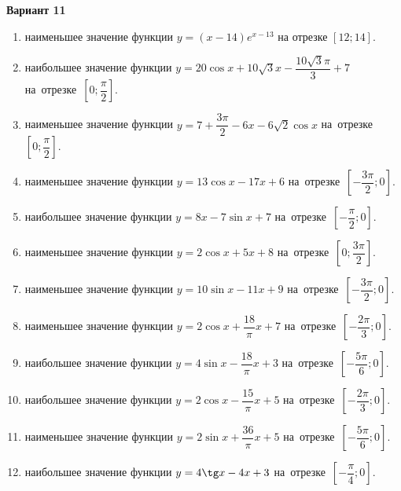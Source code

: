 \documentclass[a4paper,10pt]{article}
\begin{document}
\begin{center}\Large\textbf{Вариант 11}\end{center}

\begin{enumerate}
\item {} наименьшее значение функции $y=\left(x-14\right)e^{x-13}$ на отрезке $\left[12;14\right]$.

\item {} наибольшее значение функции $y=20\cos x+10\sqrt{3} x-\dfrac{10\sqrt{3} \pi }{3}+7$ на~отрезке~$\left[0;\dfrac{\pi }{2}\right]$.

\item {} наименьшее значение функции $y=7+\dfrac{3\pi }{2}-6x-6\sqrt{2}\cos x$ на~отрезке~$\left[0;\dfrac{\pi }{2}\right]$.

\item {} наименьшее значение функции $y=13\cos x-17x+6$ на~отрезке~$\left[-\dfrac{3\pi }{2};0\right]$.

\item {} наибольшее значение функции $y=8x-7\sin x+7$ на~отрезке~$\left[-\dfrac{\pi }{2};0\right]$.

\item {} наименьшее значение функции $y=2\cos x+5x+8$ на~отрезке~$\left[0;\dfrac{3\pi }{2}\right]$.

\item {} наименьшее значение функции $y=10\sin x-11x+9$ на~отрезке~$\left[-\dfrac{3\pi }{2};0\right]$.

\item {} наименьшее значение функции $y=2\cos x+\dfrac{18}{\pi }x+7$ на~отрезке~$\left[-\dfrac{2\pi }{3};0\right]$.

\item {} наибольшее значение функции $y=4\sin x-\dfrac{18}{\pi }x+3$ на~отрезке~$\left[-\dfrac{5\pi }{6};0\right]$.

\item {} наибольшее значение функции $y=2\cos x-\dfrac{15}{\pi }x+5$ на~отрезке~$\left[-\dfrac{2\pi }{3};0\right]$.

\item {} наименьшее значение функции $y=2\sin x+\dfrac{36}{\pi }x+5$ на~отрезке~$\left[-\dfrac{5\pi }{6};0\right]$.

\item {} наибольшее значение функции $y=4\tg x-4x+3$ на~отрезке~$\left[-\dfrac{\pi }{4};0\right]$.


\end{enumerate}
\end{document}
